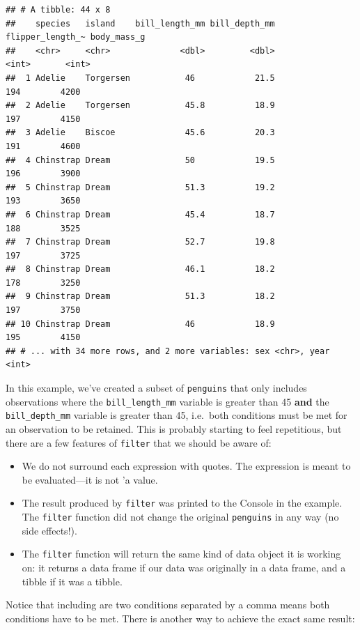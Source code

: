 \documentclass[
]{book}
\providecommand{\tightlist}{%
  \setlength{\itemsep}{0pt}\setlength{\parskip}{0pt}}
\begin{document}
\begin{verbatim}
## # A tibble: 44 x 8
##    species   island    bill_length_mm bill_depth_mm flipper_length_~ body_mass_g
##    <chr>     <chr>              <dbl>         <dbl>            <int>       <int>
##  1 Adelie    Torgersen           46            21.5              194        4200
##  2 Adelie    Torgersen           45.8          18.9              197        4150
##  3 Adelie    Biscoe              45.6          20.3              191        4600
##  4 Chinstrap Dream               50            19.5              196        3900
##  5 Chinstrap Dream               51.3          19.2              193        3650
##  6 Chinstrap Dream               45.4          18.7              188        3525
##  7 Chinstrap Dream               52.7          19.8              197        3725
##  8 Chinstrap Dream               46.1          18.2              178        3250
##  9 Chinstrap Dream               51.3          18.2              197        3750
## 10 Chinstrap Dream               46            18.9              195        4150
## # ... with 34 more rows, and 2 more variables: sex <chr>, year <int>
\end{verbatim}

In this example, we've created a subset of \texttt{penguins} that only includes observations where the \texttt{bill\_length\_mm} variable is greater than 45 \textbf{and} the \texttt{bill\_depth\_mm} variable is greater than 45, i.e.~both conditions must be met for an observation to be retained. This is probably starting to feel repetitious, but there are a few features of \texttt{filter} that we should be aware of:

\begin{itemize}
\tightlist
\item
  We do not surround each expression with quotes. The expression is meant to be evaluated---it is not 'a value.
\item
  The result produced by \texttt{filter} was printed to the Console in the example. The \texttt{filter} function did not change the original \texttt{penguins} in any way (no side effects!).
\item
  The \texttt{filter} function will return the same kind of data object it is working on: it returns a data frame if our data was originally in a data frame, and a tibble if it was a tibble.
\end{itemize}

Notice that including are two conditions separated by a comma means both conditions have to be met. There is another way to achieve the exact same result:
\end{document}
